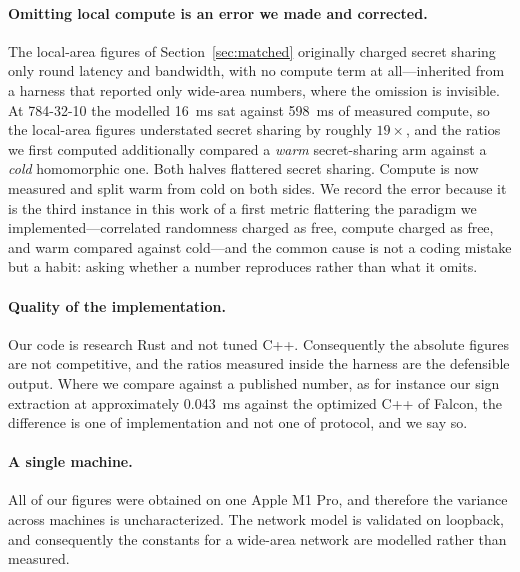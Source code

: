 \documentclass[11pt]{article}
\begin{document}
\paragraph{Omitting local compute is an error we made and corrected.} The
local-area figures of Section~\ref{sec:matched} originally charged secret sharing
only round latency and bandwidth, with no compute term at all---inherited from a
harness that reported only wide-area numbers, where the omission is invisible. At
784-32-10 the modelled \SI{16}{\milli\second} sat against \SI{598}{\milli\second}
of measured compute, so the local-area figures understated secret sharing by
roughly $19\times$, and the ratios we first computed additionally compared a
\emph{warm} secret-sharing arm against a \emph{cold} homomorphic one. Both halves
flattered secret sharing. Compute is now measured and split warm from cold on both
sides. We record the error because it is the third instance in this work of a first
metric flattering the paradigm we implemented---correlated randomness charged as
free, compute charged as free, and warm compared against cold---and the common
cause is not a coding mistake but a habit: asking whether a number reproduces
rather than what it omits.

\paragraph{Quality of the implementation.} Our code is research Rust and not tuned C++.
Consequently the absolute figures are not competitive, and the ratios measured inside the harness
are the defensible output. Where we compare against a published number, as for instance our sign
extraction at approximately \SI{0.043}{\milli\second} against the optimized C++ of Falcon, the
difference is one of implementation and not one of protocol, and we say so.

\paragraph{A single machine.} All of our figures were obtained on one Apple M1 Pro, and
therefore the variance across machines is uncharacterized. The network model is validated on
loopback, and consequently the constants for a wide-area network are modelled rather than
measured.
\end{document}
